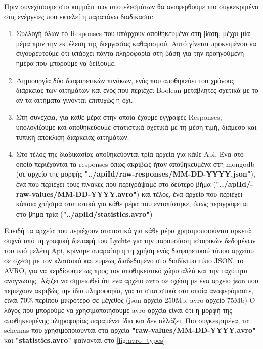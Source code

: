 Πριν συνεχίσουμε στο κομμάτι των αποτελεσμάτων θα αναφερθούμε πιο συγκεκριμένα στις
ενέργειες που εκτελεί η παραπάνω διαδικασία:

\begin{enumerate}
	\item Συλλογή όλων το Responses που υπάρχουν αποθηκευμένα στη βάση, μέχρι μία μέρα πριν την εκτέλεση της διεργασίας καθαρισμού. Αυτό γίνεται προκειμένου να σιγουρευτούμε ότι υπάρχει πάντα πληροφορία στη βάση για την προηγούμενη ημέρα που μπορούμε να δείξουμε.
	\item Δημιουργία δύο διαφορετικών πινάκων, ενός που αποθηκεύει του χρόνους διάρκειας των αιτημάτων και ενός που περιέχει Boolean μεταβλητές σχετικά με το αν τα αιτήματα γίνονται επιτυχώς ή όχι.
	\item Στη συνέχεια, για κάθε μέρα στην οποία έχουμε εγγραφές Responses, υπολογίζουμε και αποθηκεύουμε στατιστικά σχετικά με τη μέση τιμή, διάμεσο και τυπική απόκλιση διάρκειας αιτημάτων.
	\item Στο τέλος της διαδικασίας αποθηκεύονται τρία αρχεία για κάθε Api. Ένα στο οποίο περιέχονται τα responses όπως ακριβώς ήταν αποθηκευμένα στη mongodb (σε αρχείο της μορφής \textbf{"../apiId/raw-responses/MM-DD-YYYY.json"}),
		ένα που περιέχει τους πίνακες που περιγράψαμε στο δεύτερο βήμα (\textbf{"../apiId/\hyp{}raw-values/MM-DD-YYYY.avro"}) και τέλος, ένα αρχείο που περιέχει κάποια χρήσιμα στατιστικά για κάθε μέρα που εντοπίστηκε, όπως περιγράφεται στο βήμα τρία (\textbf{"../apiId/statistics.avro"}) 
\end{enumerate}

Επειδή τα αρχεία που περιέχουν στατιστικά για κάθε μέρα χρησιμοποιούνται αρκετά συχνά από τη γραφική διεπαφή του Lychte για την παρουσίαση ιστορικών δεδομένων του υπό μελέτη Api, κρίναμε απαραίτητη τη χρήση ενός διαφορετικού τύπου αρχείου σε σχέση με
τον κλασσικό και ευρέως διαδεδομένο στο διαδίκτυο τύπο JSON, το AVRO, για να κερδίσουμε ως προς τον αποθηκευτικό χώρο αλλά και την ταχύτητα ανάγνωσης. Αξίζει να σημειωθεί ότι ένα αρχέιο avro σε σχέση με ένα αρχείο json που περιέχουν ακριβώς την ίδια
πληροφορία, για τα στατιστικά στα οποία αναφερόμαστε, είναι 70\% περίπου μικρότερο σε μέγεθος (json αρχείο 250Μb, avro αρχείο 75Μb)
Ο λόγος που μπορούμε να χρησιμοποιήσουμε avro αρχεία είναι ότι η μορφή της αποθηκευμένης πληροφορίας παραμένει ίδια και δεν αλλάζει. Πιο συγκεκριμένα, τα schemas που χρησιμοποιούνται στα αρχεία \textbf{"raw-values/MM-DD-YYYY.avro"} και \textbf{"statistics.avro"}
φαίνονται στο \autoref{fig:avro_types}.

